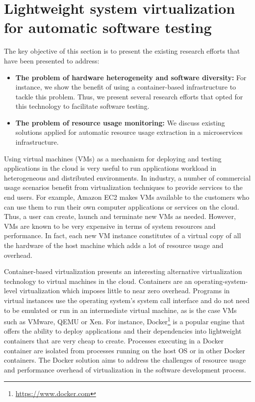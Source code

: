 \section{Lightweight system virtualization for automatic software testing}
\label{sec:Lightweight system virtualization for software testing}

The key objective of this section is to present the existing research efforts that have been presented to address:
\begin{itemize}
	\item \textbf{The problem of hardware heterogeneity and software diversity:} For instance, we show the benefit of using a container-based infrastructure to tackle this problem. Thus, we present several research efforts that opted for this technology to facilitate software testing. 
	
	\item \textbf{The problem of resource usage monitoring:} We discuss existing solutions applied for automatic resource usage extraction in a microservices infrastructure. 
\end{itemize}


Using virtual machines (VMs) as a mechanism for deploying and testing applications in the cloud is very useful to run applications workload in heterogeneous and distributed environments.
In industry, a number of commercial usage scenarios benefit from virtualization techniques to provide services to the end users. For example, Amazon EC2 makes VMs available to the customers who can use them to run their own computer applications or services on the cloud. Thus, a user can create, launch and terminate new VMs as needed.  
However, VMs are known to be very expensive in terms of system resources and performance. In fact, each new VM instance constitutes of a virtual copy of all the hardware of the host machine which adds a lot of resource usage and overhead\cite{merkel2014docker}. 

Container-based virtualization presents an interesting alternative virtualization technology to virtual machines in the cloud. Containers are an operating-system-level virtualization which imposes little to near zero overhead. Programs in virtual instances use the operating system's system call interface and do not need to be emulated or run in an intermediate virtual machine, as is the case VMs such as VMware, QEMU or Xen.
For instance, Docker\footnote{\url{https://www.docker.com}} is a popular engine that offers the ability to deploy applications and their dependencies into lightweight containers that are very cheap to create. Processes executing in a Docker container are isolated from processes running on the host OS or in other Docker containers. The Docker solution aims to address the challenges of resource usage and performance overhead of virtualization in the software development process. 

